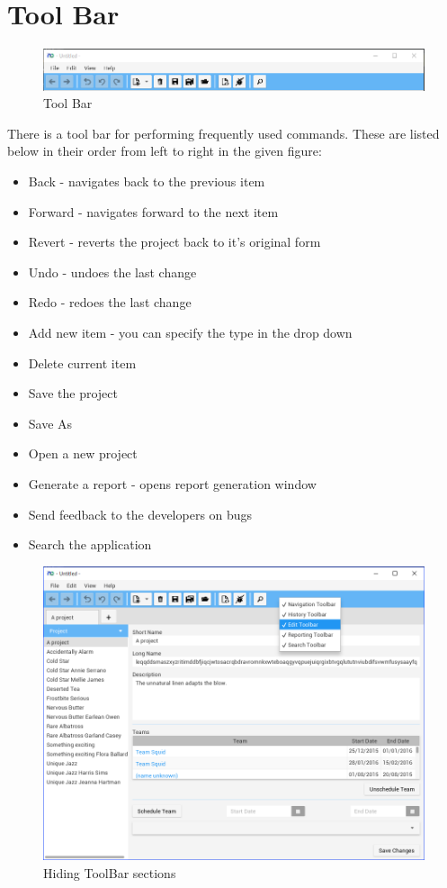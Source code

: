 \section{Tool Bar}

\begin{figure}[H]
	\centering
	\includegraphics[width=\textwidth]{images/screenshots/toolbar.PNG}
	\caption{Tool Bar}
	\label{fig:new_project}
\end{figure}

There is a tool bar for performing frequently used commands. These are listed below in their order from left to right in the given figure:

\begin{itemize}
\item Back - navigates back to the previous item
\item Forward - navigates forward to the next item
\item Revert - reverts the project back to it's original form
\item Undo - undoes the last change
\item Redo - redoes the last change
\item Add new item - you can specify the type in the drop down
\item Delete current item
\item Save the project
\item Save As
\item Open a new project
\item Generate a report - opens report generation window
\item Send feedback to the developers on bugs
\item Search the application
\end{itemize}

\begin{figure}[H]
	\centering
	\includegraphics[width=\textwidth]{images/screenshots/toolbar1.PNG}
	\caption{Hiding ToolBar sections}
	\label{fig:new_project}
\end{figure}

